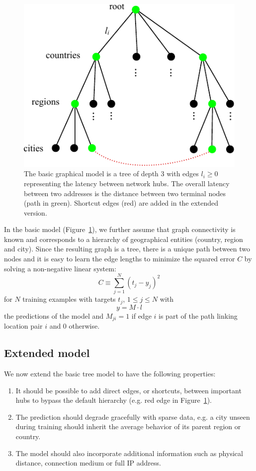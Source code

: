 \documentclass[10pt,a4paper,notitlepage,twocolumn]{article}
\begin{document}
\begin{figure}[h]
\centering
\includegraphics[width=0.8\columnwidth]{tree}
\caption{The basic graphical model is a tree of depth 3 with edges $l_i\ge0$ representing the latency between network hubs.
The overall latency between two addresses is the distance between two terminal nodes (path in green).
Shortcut edges (red) are added in the extended version.
}
\label{fig:tree}
\end{figure}


In the basic model (Figure~\ref{fig:tree}), we further assume that graph connectivity is known and corresponds to a hierarchy of geographical entities (country, region and city).
Since the resulting graph is a tree, there is a unique path between two nodes and it is easy to learn the edge lengths to minimize the squared error $C$ by solving a non-negative linear system:
\begin{equation} \label{eq:cost}
C \equiv \sum_{j=1}^N(t_j-y_j)^2
\end{equation}
for $N$ training examples with targets $t_j$, $1\le j\le N$ with
\begin{equation} \label{eq:y}
y = M\cdot l
\end{equation}
the predictions of the model and $M_{ji}=1$ if edge $i$ is part of the path linking location pair $i$ and 0 otherwise.


\subsection{Extended model}

We now extend the basic tree model to have the following properties:
\begin{enumerate}
\item It should be possible to add direct edges, or shortcuts, between important hubs to bypass the default hierarchy (e.g. red edge in Figure~\ref{fig:tree}).
\item The prediction should degrade gracefully with sparse data, e.g. a city unseen during training should inherit the average behavior of its parent region or country.
\item The model should also incorporate additional information such as physical distance, connection medium or full IP address.
\end{enumerate}
\end{document}
